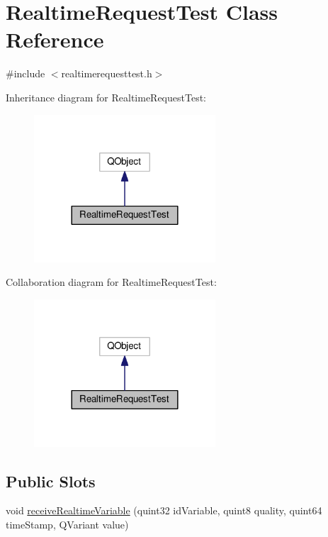 \hypertarget{class_realtime_request_test}{}\section{Realtime\+Request\+Test Class Reference}
\label{class_realtime_request_test}


{\ttfamily \#include $<$realtimerequesttest.\+h$>$}



Inheritance diagram for Realtime\+Request\+Test\+:
\nopagebreak
\begin{figure}[H]
\begin{center}
\leavevmode
\includegraphics[width=192pt]{class_realtime_request_test__inherit__graph}
\end{center}
\end{figure}


Collaboration diagram for Realtime\+Request\+Test\+:
\nopagebreak
\begin{figure}[H]
\begin{center}
\leavevmode
\includegraphics[width=192pt]{class_realtime_request_test__coll__graph}
\end{center}
\end{figure}
\subsection*{Public Slots}
\begin{DoxyCompactItemize}
\item 
void \hyperlink{class_realtime_request_test_aaba48d812f7cabec67143de8ff529d32}{receive\+Realtime\+Variable} (quint32 id\+Variable, quint8 quality, quint64 time\+Stamp, Q\+Variant value)
\end{DoxyCompactItemize}
